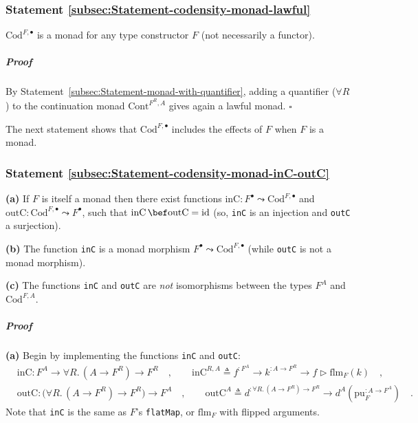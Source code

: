 \subsubsection{Statement \label{subsec:Statement-codensity-monad-lawful}\ref{subsec:Statement-codensity-monad-lawful}}

$\text{Cod}^{F,\bullet}$ is a monad for any type constructor $F$
(not necessarily a functor).

\subparagraph{Proof}

By Statement~\ref{subsec:Statement-monad-with-quantifier}, adding
a quantifier ($\forall R$) to the continuation monad $\text{Cont}^{F^{R},A}$
gives again a lawful monad. $\square$

The next statement shows that $\text{Cod}^{F,\bullet}$ includes the
effects of $F$ when $F$ is a monad.

\subsubsection{Statement \label{subsec:Statement-codensity-monad-inC-outC}\ref{subsec:Statement-codensity-monad-inC-outC}}

\textbf{(a)} If $F$ is itself a monad then there exist functions
$\text{inC}:F^{\bullet}\leadsto\text{Cod}^{F,\bullet}$ and $\text{outC}:\text{Cod}^{F,\bullet}\leadsto F^{\bullet}$,
such that $\text{inC}\,\bef\text{outC}=\text{id}$ (so, \lstinline!inC!
is an injection and \lstinline!outC! a surjection). 

\textbf{(b)} The function \lstinline!inC! is a monad morphism $F^{\bullet}\leadsto\text{Cod}^{F,\bullet}$
(while \lstinline!outC! is not a monad morphism).

\textbf{(c)} The functions \lstinline!inC! and \lstinline!outC!
are \emph{not} isomorphisms between the types $F^{A}$ and $\text{Cod}^{F,A}$.

\subparagraph{Proof}

\textbf{(a)} Begin by implementing the functions \lstinline!inC!
and \lstinline!outC!:
\begin{align*}
 & \text{inC}:F^{A}\rightarrow\forall R.\,(A\rightarrow F^{R})\rightarrow F^{R}\quad,\quad\quad\text{inC}^{R,A}\triangleq f^{:F^{A}}\rightarrow k^{:A\rightarrow F^{R}}\rightarrow f\triangleright\text{flm}_{F}(k)\quad,\\
 & \text{outC}:\big(\forall R.\,(A\rightarrow F^{R})\rightarrow F^{R}\big)\rightarrow F^{A}\quad,\quad\quad\text{outC}^{A}\triangleq d^{:\forall R.\,(A\rightarrow F^{R})\rightarrow F^{R}}\rightarrow d^{A}(\text{pu}_{F}^{:A\rightarrow F^{A}})\quad.
\end{align*}
Note that \lstinline!inC! is the same as $F$\textsf{'}s \lstinline!flatMap!,
or $\text{flm}_{F}$ with flipped arguments.

